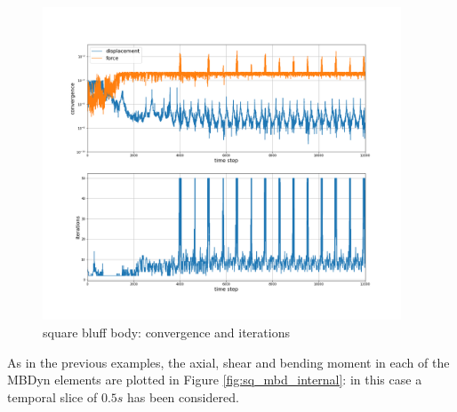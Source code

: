 \begin{figure}[htbp!]
	\centering
	\includegraphics[width=0.95\textwidth, trim=0 80 0 100, clip]{images/sq-cyl/MBD_iterations_sq.png}
	\caption{square bluff body: convergence and iterations}
	\label{fig:sq_mbd_iter}
\end{figure}

As in the previous examples, the axial, shear and bending moment in each of the MBDyn elements are plotted in Figure \ref{fig:sq_mbd_internal}: in this case a temporal slice of $0.5s$ has been considered.

